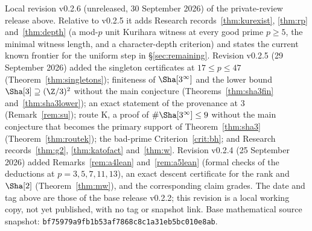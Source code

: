 \par\noindent\small Local revision v0.2.6 (unreleased, 30 September 2026) of the private-review release above. Relative to v0.2.5 it adds Research records~\ref{thm:kurexist}, \ref{thm:rp} and~\ref{thm:depth} (a mod-$p$ unit Kurihara witness at every good prime $p\ge5$, the minimal witness length, and a character-depth criterion) and states the current known frontier for the uniform step in \S\ref{sec:remaining}. Revision v0.2.5 (29 September 2026) added the singleton certificates at $17\le p\le47$ (Theorem~\ref{thm:singletons}); finiteness of $\Sha[3^\infty]$ and the lower bound $\Sha[3]\supseteq(\Z/3)^2$ without the main conjecture (Theorems~\ref{thm:sha3fin} and~\ref{thm:sha3lower}); an exact statement of the provenance at $3$ (Remark~\ref{rem:su}); route K, a proof of $\#\Sha[3^\infty]\le9$ without the main conjecture that becomes the primary support of Theorem~\ref{thm:sha3} (Theorem~\ref{thm:routek}); the bad-prime Criterion~\ref{crit:bh}; and Research records~\ref{thm:g2}, \ref{thm:katofact} and~\ref{thm:w}. Revision v0.2.4 (25 September 2026) added Remarks~\ref{rem:a4lean} and~\ref{rem:a5lean} (formal checks of the deductions at $p=3,5,7,11,13$), an exact descent certificate for the rank and $\Sha[2]$ (Theorem~\ref{thm:mw}), and the corresponding claim grades. The date and tag above are those of the base release v0.2.2; this revision is a local working copy, not yet published, with no tag or snapshot link. Base mathematical source snapshot: \nolinkurl{bf75979a9fb1b53af7868c8c1a31eb5bc010e8ab}.\normalsize
